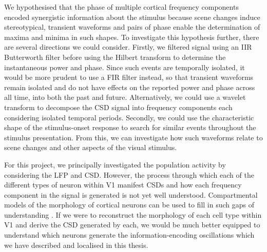 We hypothesised that the phase of multiple cortical frequency components encoded synergistic information about the stimulus because scene changes induce stereotypical, transient waveforms and pairs of phase enable the determination of maxima and minima in such shapes.
To investigate this hypothesis further, there are several directions we could consider.
Firstly, we filtered signal using an \ac{IIR} Butterworth filter before using the Hilbert transform to determine the instantaneous power and phase.
Since such events are temporally isolated, it would be more prudent to use a \ac{FIR} filter instead, so that transient waveforms remain isolated and do not have effects on the reported power and phase across all time, into both the past and future.
Alternatively, we could use a wavelet transform to decompose the \ac{CSD} signal into frequency components each considering isolated temporal periods.
Secondly, we could use the characteristic shape of the stimulus-onset response to search for similar events throughout the stimulus presentation.
From this, we can investigate how such waveforms relate to scene changes and other aspects of the visual stimulus.


For this project, we principally investigated the population activity by considering the \ac{LFP} and \ac{CSD}.
However, the process through which each of the different types of neuron within \ac{V1} manifest \acp{CSD} and how each frequency component in the signal is generated is not yet well understood.
Compartmental models of the morphology of cortical neurons can be used to fill in such gaps of understanding \citep{Leski2013}.
If we were to reconstruct the morphology of each cell type within \ac{V1} and derive the \ac{CSD} generated by each, we would be much better equipped to understand which neurons generate the information-encoding oscillations which we have described and localised in this thesis.
